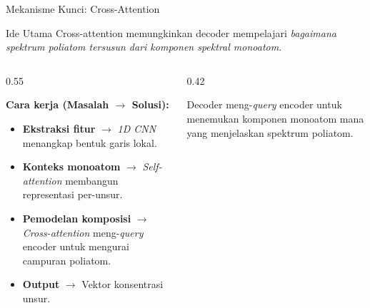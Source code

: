 \documentclass{beamer}
\def\\{}%
\begin{document}
\begin{frame}{Mekanisme Kunci: Cross-Attention}
  \begin{block}{Ide Utama}
    {\small Cross-attention memungkinkan decoder mempelajari \emph{bagaimana spektrum poliatom tersusun dari komponen spektral monoatom}.}
  \end{block}

  \begin{columns}[T,onlytextwidth]
    \begin{column}{0.55\textwidth}
      {\small
      \textbf{Cara kerja (Masalah $\rightarrow$ Solusi):}
      \begin{itemize}\setlength{\itemsep}{2pt}
        \item \textbf{Ekstraksi fitur} $\rightarrow$ \textit{1D CNN} menangkap bentuk garis lokal.
        \item \textbf{Konteks monoatom} $\rightarrow$ \textit{Self-attention} membangun representasi per-unsur.
        \item \textbf{Pemodelan komposisi} $\rightarrow$ \textit{Cross-attention} meng-\textit{query} encoder untuk mengurai campuran poliatom.
        \item \textbf{Output} $\rightarrow$ Vektor konsentrasi unsur.
      \end{itemize}
      }
    \end{column}
    \begin{column}{0.42\textwidth}
      \centering

      \vspace{0.2em}
      {\scriptsize Decoder meng-\textit{query} encoder untuk menemukan komponen monoatom mana yang menjelaskan spektrum poliatom.}
    \end{column}
  \end{columns}
\end{frame}
\end{document}
